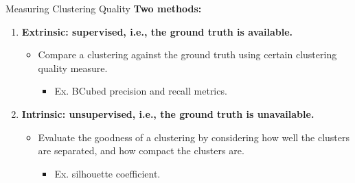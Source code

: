 \begin{frame}{Measuring Clustering Quality}
	\textbf{Two methods:}
	\begin{enumerate}
		\item \textbf{{\color{airforceblue}Extrinsic}: supervised, i.e.,
			      the ground truth is available.}
		      \begin{itemize}
			      \item Compare a clustering against the ground truth using
			            certain clustering quality measure.
			            \begin{itemize}
				            \item Ex. BCubed precision and recall metrics.
			            \end{itemize}
		      \end{itemize}
		\item \textbf{{\color{airforceblue}Intrinsic}: unsupervised, i.e.,
			      the ground truth is unavailable.}
		      \begin{itemize}
			      \item Evaluate the goodness of a clustering by considering how
			            well the clusters are separated, and how compact the clusters
			            are.
			            \begin{itemize}
				            \item Ex. silhouette coefficient.
			            \end{itemize}
		      \end{itemize}
	\end{enumerate}
\end{frame}

